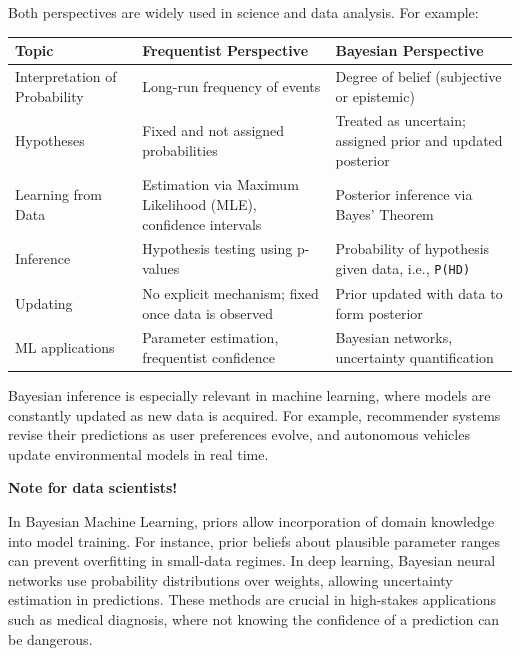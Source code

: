 \documentclass[
  12pt,
]{book}
\begin{document}
Both perspectives are widely used in science and data analysis. For example:

\begin{longtable}[]{@{}
  >{\raggedright\arraybackslash}p{}
  >{\raggedright\arraybackslash}p{}
  >{\raggedright\arraybackslash}p{}@{}}
\toprule\noalign{}
\begin{minipage}[b]{\linewidth}\raggedright
Topic
\end{minipage} & \begin{minipage}[b]{\linewidth}\raggedright
Frequentist Perspective
\end{minipage} & \begin{minipage}[b]{\linewidth}\raggedright
Bayesian Perspective
\end{minipage} \\
\midrule\noalign{}
\endhead
\bottomrule\noalign{}
\endlastfoot
Interpretation of Probability & Long-run frequency of events & Degree of belief (subjective or epistemic) \\
Hypotheses & Fixed and not assigned probabilities & Treated as uncertain; assigned prior and updated posterior \\
Learning from Data & Estimation via Maximum Likelihood (MLE), confidence intervals & Posterior inference via Bayes' Theorem \\
Inference & Hypothesis testing using p-values & Probability of hypothesis given data, i.e., \texttt{P(H\textbar{}D)} \\
Updating & No explicit mechanism; fixed once data is observed & Prior updated with data to form posterior \\
ML applications & Parameter estimation, frequentist confidence & Bayesian networks, uncertainty quantification \\
\end{longtable}

Bayesian inference is especially relevant in machine learning, where models are constantly updated as new data is acquired. For example, recommender systems revise their predictions as user preferences evolve, and autonomous vehicles update environmental models in real time.

\begin{tipbox}

\textbf{Note for data scientists!}

In Bayesian Machine Learning, priors allow incorporation of domain knowledge into model training. For instance, prior beliefs about plausible parameter ranges can prevent overfitting in small-data regimes. In deep learning, Bayesian neural networks use probability distributions over weights, allowing uncertainty estimation in predictions. These methods are crucial in high-stakes applications such as medical diagnosis, where not knowing the confidence of a prediction can be dangerous.

\end{tipbox}
\end{document}
